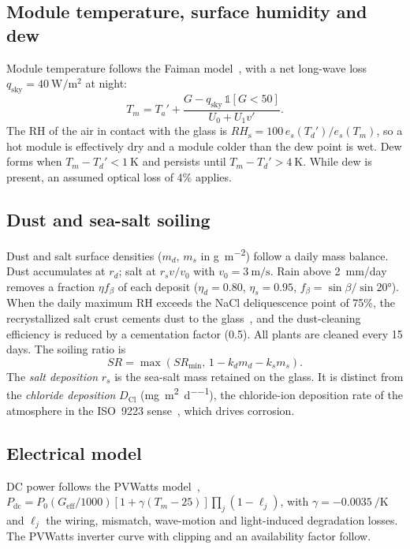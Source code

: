 \documentclass[preprint,11pt]{elsarticle}
\newcommand{\RHs}{\mathit{RH}_{\mathrm{s}}}
\begin{document}
\subsection{Module temperature, surface humidity and dew}
Module temperature follows the Faiman model~\cite{faiman2008}, with a net long-wave loss $q_{\mathrm{sky}}=
\SI{40}{\watt\per\square\metre}$ at night:
\begin{equation}
T_m = T_a' + \frac{G - q_{\mathrm{sky}}\,\mathbb{1}[G<50]}{U_0 + U_1 v'}.
\label{eq:faiman}
\end{equation}
The RH of the air in contact with the glass is $\RHs = 100\,e_s(T_d')/e_s(T_m)$, so a hot module is effectively dry and a
module colder than the dew point is wet. Dew forms when $T_m - T_d' < \SI{1}{\kelvin}$ and persists until
$T_m - T_d' > \SI{4}{\kelvin}$. While dew is present, an assumed optical loss of 4\% applies.

\subsection{Dust and sea-salt soiling}
Dust and salt surface densities ($m_d$, $m_s$ in \si{\gram\per\square\metre}) follow a daily mass balance. Dust
accumulates at $r_d$; salt at $r_s v/v_0$ with $v_0=\SI{3}{\metre\per\second}$. Rain above \SI{2}{mm/day} removes a
fraction $\eta f_\beta$ of each deposit ($\eta_d=0.80$, $\eta_s=0.95$, $f_\beta=\sin\beta/\sin\ang{20}$). When the daily
maximum RH exceeds the NaCl deliquescence point of 75\%, the recrystallized salt crust cements dust to the
glass~\cite{ahmad2026}, and the dust-cleaning efficiency is reduced by a cementation factor (0.5). All plants are
cleaned every 15 days. The soiling ratio is
\begin{equation}
\mathit{SR} = \max\left(\mathit{SR}_{\min},\,1 - k_d m_d - k_s m_s\right).
\label{eq:soiling}
\end{equation}
The \emph{salt deposition} $r_s$ is the sea-salt mass retained on the glass. It is distinct from the \emph{chloride
deposition} $D_{\mathrm{Cl}}$ (\si{\milli\gram\per\square\metre\per\day}), the chloride-ion deposition rate of the
atmosphere in the ISO~9223 sense~\cite{iso9223}, which drives corrosion.

\subsection{Electrical model}
DC power follows the PVWatts model~\cite{dobos2014},
$P_{\mathrm{dc}} = P_0 (G_{\mathrm{eff}}/1000)[1+\gamma(T_m-25)]\prod_j(1-\ell_j)$, with $\gamma=\SI{-0.0035}{\per\kelvin}$
and $\ell_j$ the wiring, mismatch, wave-motion and light-induced degradation losses. The PVWatts inverter curve with
clipping and an availability factor follow.
\end{document}
